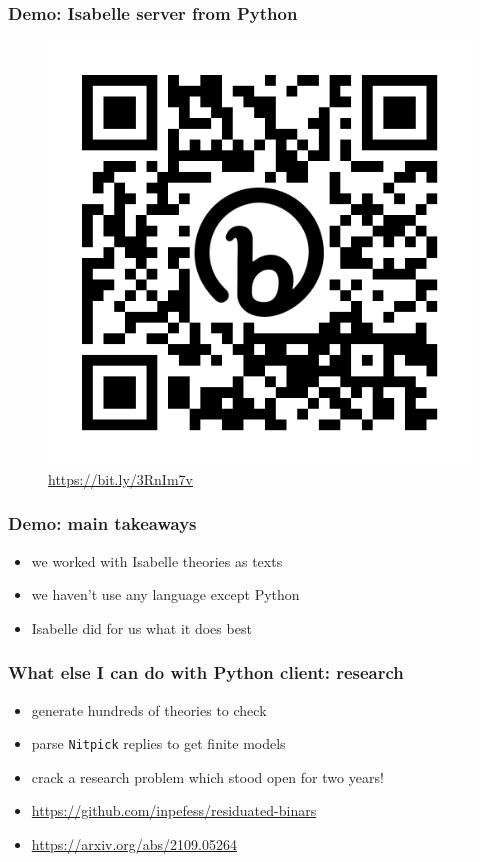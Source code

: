 \documentclass{beamer}
\begin{document}
\begin{frame}
\frametitle{Demo: Isabelle server from Python}
\begin{figure}
\caption*{\url{https://bit.ly/3RnIm7v}}
\includegraphics[scale=0.25]{bit.ly_3RnIm7v.png}
\end{figure}
\end{frame}
\begin{frame}[t]
\frametitle{Demo: main takeaways}
\begin{itemize}
\item we worked with Isabelle theories as texts
\item we haven't use any language except Python
\item Isabelle did for us what it does best
\end{itemize}
\end{frame}
\begin{frame}[t]
\frametitle{What else I can do with Python client: research}
\begin{itemize}
\item generate hundreds of theories to check
\item parse \texttt{Nitpick} replies to get finite models
\item crack a research problem which stood open for two years!
\item \url{https://github.com/inpefess/residuated-binars}
\item \url{https://arxiv.org/abs/2109.05264}
\end{itemize}
\end{frame}
\end{document}

